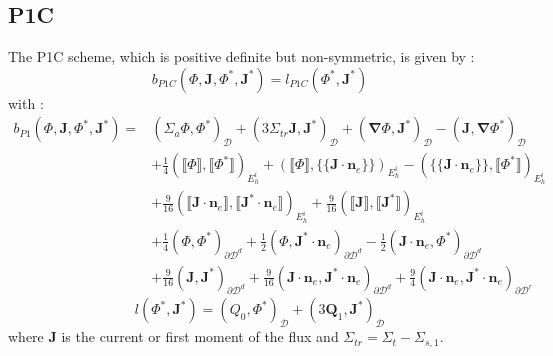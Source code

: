 \documentclass[preprint,10pt]{elsarticle}
\newcommand\bn{\boldsymbol{\nabla}}
\newcommand\bs{\boldsymbol}
\newcommand\ldb{\{\!\!\{}
\newcommand\rdb{\}\!\!\}}
\newcommand\llb{\llbracket}
\newcommand\rrb{\rrbracket}
\renewcommand{\(}{\left(}
\renewcommand{\)}{\right)}
\renewcommand{\[}{\left[}
\renewcommand{\]}{\right]}
\begin{document}
\begin{appendices}
\subsection{P1C}
The P1C scheme, which is positive definite but non-symmetric, is given by :
\begin{equation}
b_{P1C}(\Phi,\bs{J},\Phi^*,\bs{J}^*) = l_{P1C}(\Phi^*,\bs{J}^*)
\end{equation}
with :
\begin{equation}
\begin{split}
b_{P1}(\Phi,\bs{J},\Phi^*,\bs{J}^*) = & (\Sigma_a \Phi,\Phi^*)_{\mathcal{D}} +
(3\Sigma_{tr} \bs{J},\bs{J}^*)_{\mathcal{D}} + (\bn
\Phi,\bs{J}^*)_{\mathcal{D}} - (\bs{J},\bn \Phi^*)_{\mathcal{D}}\\
&+\frac{1}{4} \(\llb\Phi\rrb,\llb\Phi^*\rrb\)_{E_h^i} +
\(\llb\Phi\rrb,\ldb\bs{J}\cdot\bs{n}_e\rdb\)_{E_h^i} - (\ldb
\bs{J}\cdot\bs{n}_e\rdb, \llb\Phi^*\rrb)_{E_h^i}\\
&+\frac{9}{16}\(\llb\bs{J}\cdot\bs{n}_e\rrb,\llb\bs{J}^*\cdot\bs{n}_e\rrb\)_{E_h^i}
+ \frac{9}{16}\(\llb\bs{J}\rrb,\llb\bs{J}^*\rrb\)_{E_h^i}\\
&+\frac{1}{4}(\Phi,\Phi^*)_{\partial \mathcal{D}^d} +
\frac{1}{2}(\Phi,\bs{J}^*\cdot\bs{n}_e)_{\partial \mathcal{D}^d} - \frac{1}{2}
(\bs{J}\cdot\bs{n}_e,\Phi^*)_{\partial\mathcal{D}^d}\\
&+\frac{9}{16}(\bs{J},\bs{J}^*)_{\partial
\mathcal{D}^d}+\frac{9}{16}(\bs{J}\cdot\bs{n}_e,\bs{J}^*\cdot\bs{n}_e)_{\partial 
\mathcal{D}^d} + \frac{9}{4} (\bs{J}\cdot\bs{n}_e,\bs{J}^*\cdot\bs{n}_e)_{\partial
\mathcal{D}^r}
\end{split}
\end{equation}
\begin{equation}
l(\Phi^*,\bs{J}^*) = (Q_0,\Phi^*)_{\mathcal{D}} +
(3\bs{Q}_1,\bs{J}^*)_{\mathcal{D}}
\end{equation}
where $\bs{J}$ is the current or first moment of the flux and 
$\Sigma_{tr}=\Sigma_t-\Sigma_{s,1}$.
\end{appendices}
\end{document}
